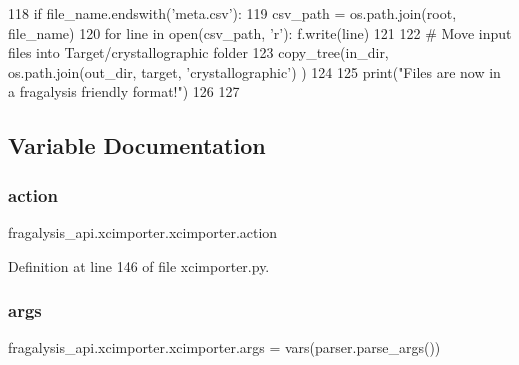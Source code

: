 \begin{DoxyCode}
118                     \textcolor{keywordflow}{if} file\_name.endswith(\textcolor{stringliteral}{'meta.csv'}):
119                         csv\_path = os.path.join(root, file\_name)
120                         \textcolor{keywordflow}{for} line \textcolor{keywordflow}{in} open(csv\_path, \textcolor{stringliteral}{'r'):                            f.write(line)}
121 \textcolor{stringliteral}{}
122 \textcolor{stringliteral}{    }\textcolor{comment}{# Move input files into Target/crystallographic folder}
123     copy\_tree(in\_dir, os.path.join(out\_dir, target, \textcolor{stringliteral}{'crystallographic'}) )
124 
125     print(\textcolor{stringliteral}{"Files are now in a fragalysis friendly format!"})
126 
127 \end{DoxyCode}


\subsection{Variable Documentation}
\mbox{\label{namespacefragalysis__api_1_1xcimporter_1_1xcimporter_a2f2ce1af5a866eee454177b072be63f8}} 
\subsubsection{\texorpdfstring{action}{action}}
{\footnotesize\ttfamily fragalysis\+\_\+api.\+xcimporter.\+xcimporter.\+action}



Definition at line 146 of file xcimporter.\+py.

\mbox{\label{namespacefragalysis__api_1_1xcimporter_1_1xcimporter_a3ad0db7b1c2c8a00d4963bf5f7dd21bc}} 
\subsubsection{\texorpdfstring{args}{args}}
{\footnotesize\ttfamily fragalysis\+\_\+api.\+xcimporter.\+xcimporter.\+args = vars(parser.\+parse\+\_\+args())}



